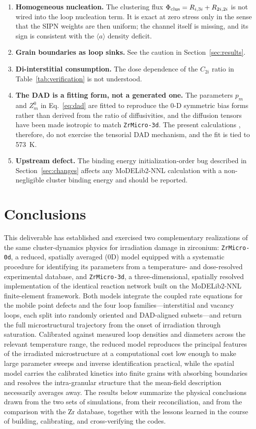 \documentclass{article}
\newcommand{\aloop}{\ensuremath{\langle a\rangle}}
\newcommand{\ZrM}{\texttt{ZrMicro-3d}}
\newcommand{\MoD}{\textsf{MoDELib2-NNL}}
\newcommand{\ZrOd}{\texttt{ZrMicro-0d}}
\begin{document}
\begin{enumerate}
\item \textbf{Homogeneous nucleation.} The clustering flux
$\Phi_{\rm clus} = R_{i,3i} + R_{2i,2i}$ is not wired into the loop nucleation
term. It is exact at zero stress only in the sense that the SIPN weights are then
uniform; the channel itself is missing, and its sign is consistent with the
\aloop{} density deficit.
\item \textbf{Grain boundaries as loop sinks.} See the caution in
Section~\ref{sec:results}.
\item \textbf{Di-interstitial consumption.} The dose dependence of the $C_{2i}$
ratio in Table~\ref{tab:verification} is not understood.
\item \textbf{The DAD is a fitting form, not a generated one.} The parameters
$p_m$ and $Z^0_m$ in Eq.~\eqref{eq:dad} are fitted to reproduce the 0-D symmetric
bias forms rather than derived from the ratio of diffusivities, and the diffusion
tensors have been made isotropic to match \ZrM{}. The present calculations
, therefore, do not exercise the tensorial DAD mechanism, and the fit is tied to
573~K.
\item \textbf{Upstream defect.} The binding energy initialization-order bug
described in Section~\ref{sec:changes} affects any \MoD{} calculation with a
non-negligible cluster binding energy and should be reported.
\end{enumerate}



\section{Conclusions}

This deliverable has established and exercised two complementary realizations of the same cluster-dynamics physics for irradiation damage in zirconium: {\ZrOd}, a reduced, spatially averaged (0D) model equipped with a systematic procedure for identifying its parameters from a temperature- and dose-resolved experimental database, and {\ZrM}, a three-dimensional, spatially resolved implementation of the identical reaction network built on the {\MoD} finite-element framework. Both models integrate the coupled rate equations for the mobile point defects and the four loop families---interstitial and vacancy loops, each split into randomly oriented and DAD-aligned subsets---and return the full microstructural trajectory from the onset of irradiation through saturation. Calibrated against measured loop densities and diameters across the relevant temperature range, the reduced model reproduces the principal features of the irradiated microstructure at a computational cost low enough to make large parameter sweeps and inverse identification practical, while the spatial model carries the calibrated kinetics into finite grains with absorbing boundaries and resolves the intra-granular structure that the mean-field description necessarily averages away. The results below summarize the physical conclusions drawn from the two sets of simulations, from their reconciliation, and from the comparison with the Zr database, together with the lessons learned in the course of building, calibrating, and cross-verifying the codes.
\end{document}
